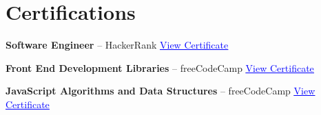 \section{Certifications}
\resumeSubHeadingListStart

  \resumeProjectHeading
    {\textbf{Software Engineer} -- HackerRank
    \hfill \href{https://www.hackerrank.com/certificates/44ed730e1d87}
    {\textcolor{blue}{\underline{View Certificate}}}}{}

  \resumeProjectHeading
    {\textbf{Front End Development Libraries} -- freeCodeCamp
    \hfill \href{https://freecodecamp.org/certification/GpurangaDasSamrat/front-end-development-libraries}
    {\textcolor{blue}{\underline{View Certificate}}}}{}

  \resumeProjectHeading
    {\textbf{JavaScript Algorithms and Data Structures} -- freeCodeCamp
    \hfill \href{https://freecodecamp.org/certification/GpurangaDasSamrat/javascript-algorithms-and-data-structures-v8}
    {\textcolor{blue}{\underline{View Certificate}}}}{}

\resumeSubHeadingListEnd

